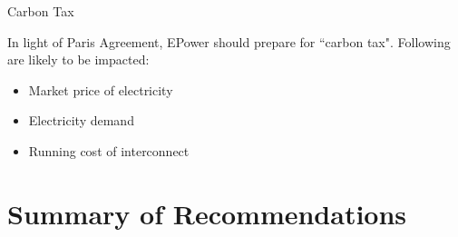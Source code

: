 \documentclass{beamer}
\renewcommand{\chartheight}{5.5cm}
\begin{document}
   	\begin{frame}{Carbon Tax}    
    

        In light of Paris Agreement, EPower should prepare for ``carbon tax". Following are likely to be impacted: 
        \small
            \begin{itemize}
            \item Market price of electricity
            \item Electricity demand
            \item Running cost of interconnect
            \end{itemize}


                
            
            \renewcommand{\chartheight}{4.5cm}
             \begin{figure}
            	\centering
            \end{figure}
        
    \end{frame}
    
    
  
    

	\section{Summary of Recommendations}
    
    
\end{document}
